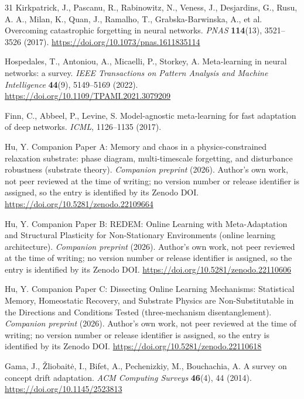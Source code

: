 \documentclass[preprint,12pt]{elsarticle}
\begin{document}
\begin{thebibliography}{31}
 Kirkpatrick, J., Pascanu, R., Rabinowitz, N.,
Veness, J., Desjardins, G., Rusu, A. A., Milan, K., Quan, J., Ramalho, T.,
Grabska-Barwinska, A., et al. Overcoming catastrophic forgetting in
neural networks. \emph{PNAS} \textbf{114}(13), 3521--3526 (2017).
\url{https://doi.org/10.1073/pnas.1611835114}

 Hospedales, T., Antoniou, A., Micaelli, P.,
Storkey, A. Meta-learning in neural networks: a survey. \emph{IEEE
Transactions on Pattern Analysis and Machine Intelligence} \textbf{44}(9),
5149--5169 (2022). \url{https://doi.org/10.1109/TPAMI.2021.3079209}

 Finn, C., Abbeel, P., Levine, S. Model-agnostic
meta-learning for fast adaptation of deep networks. \emph{ICML},
1126--1135 (2017).

 Hu, Y. Companion Paper A: Memory and chaos in a
physics-constrained relaxation substrate: phase diagram, multi-timescale
forgetting, and disturbance robustness (substrate theory).
\emph{Companion preprint} (2026). Author's own work, not peer reviewed at the
time of writing; no version number or release identifier is assigned, so the
entry is identified by its Zenodo DOI.
\url{https://doi.org/10.5281/zenodo.22109664}

 Hu, Y. Companion Paper B: REDEM: Online Learning
with Meta-Adaptation and Structural Plasticity for Non-Stationary
Environments (online learning architecture). \emph{Companion preprint}
(2026). Author's own work, not peer reviewed at the time of writing; no
version number or release identifier is assigned, so the entry is identified
by its Zenodo DOI.
\url{https://doi.org/10.5281/zenodo.22110606}

 Hu, Y. Companion Paper C: Dissecting Online
Learning Mechanisms: Statistical Memory, Homeostatic Recovery, and
Substrate Physics are Non-Substitutable in the Directions and Conditions
Tested (three-mechanism disentanglement). \emph{Companion preprint}
(2026). Author's own work, not peer reviewed at the time of writing; no
version number or release identifier is assigned, so the entry is identified
by its Zenodo DOI.
\url{https://doi.org/10.5281/zenodo.22110618}

 Gama, J., \v{Z}liobait\.e, I., Bifet, A., Pechenizkiy, M.,
Bouchachia, A. A survey on concept drift adaptation. \emph{ACM Computing
Surveys} \textbf{46}(4), 44 (2014).
\url{https://doi.org/10.1145/2523813}


\end{thebibliography}
\end{document}
